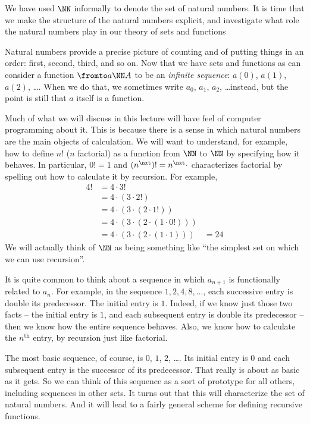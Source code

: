We have used $\NN$ informally to denote the set of natural numbers. 
It is time that we make the structure of the natural numbers explicit, and investigate what role the natural numbers play in our theory of sets and functions

Natural numbers provide a precise picture of counting and of putting things in an order: first, second, third, and so on. Now that we have sets and functions as can consider a function $\fromto a\NN A$ to be an \emph{infinite sequence}: $a(0)$, $a(1)$, $a(2)$, \ldots. When we do that, we sometimes write $a_0$, $a_1$, $a_2$, \ldots instead, but the point is still that $a$ itself is a function.

Much of what we will discuss in this lecture will have feel of computer programming about it. This is because there is a sense in which natural numbers are the main objects of calculation. We will want to understand, for example, how to define $n!$ ($n$ factorial) as a function from $\NN$ to $\NN$ by specifying how it behaves. In particular, $0! = 1$ and $(n^\nxt)! = n^\nxt\cdot$ characterizes factorial by spelling out how to calculate it by recursion. For example,
\begin{align*}
	4!  &= 4 \cdot 3! \\
		&= 4 \cdot (3 \cdot 2!)\\
		&= 4 \cdot (3 \cdot (2 \cdot 1!))\\
		&= 4 \cdot (3 \cdot (2 \cdot (1 \cdot 0!)))\\
		&= 4 \cdot (3 \cdot (2 \cdot (1 \cdot 1)))
		&= 24
\end{align*}
We will actually think of $\NN$ as being something like ``the simplest set on which we can use recursion''.

It is quite common to think about a sequence in which $a_{n+1}$ is functionally related to $a_n$. For example, in the sequence $1, 2, 4, 8,\ldots$, each successive entry is double its predecessor. The initial entry is $1$. Indeed,
if we know just those two facts -- the initial entry is $1$, and each subsequent entry is double its predecessor -- then we know how the entire sequence behaves. Also, we know how to calculate the $n^{\text{th}}$ entry, by recursion just like factorial.

The most basic sequence, of course, is $0$, $1$, $2$, \ldots. 
Its initial entry is $0$ and each subsequent entry is the successor of its predecessor. 
That really is about as basic as it gets. 
So we can think of this sequence as a sort of prototype for all others, including sequences in other sets. 
It turns out that this will characterize the set of natural numbers. And it will lead to a fairly general scheme for defining recursive functions.

